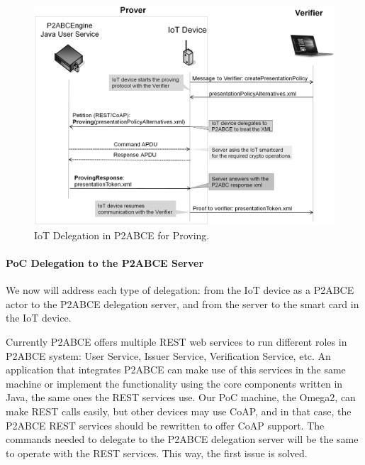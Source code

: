 \begin{figure}[bth]
	\begin{center}
		\includegraphics[width=\linewidth]{gfx/DelegationProving}
	\end{center}
	\caption{IoT Delegation in P2ABCE for Proving.}
	\label{fig:DelegationProving}
\end{figure}



\paragraph{PoC Delegation to the P2ABCE Server} \hfil

We now will address each type of delegation: from the IoT device as a P2ABCE actor to the P2ABCE delegation server, and from the server to the smart card in the IoT device.

\hfil

Currently P2ABCE offers multiple REST web services to run different roles in P2ABCE system: User Service, Issuer Service, Verification Service, etc. An application that integrates P2ABCE can make use of this services in the same machine or implement the functionality using the core components written in Java, the same ones the REST services use. Our PoC machine, the Omega2, can make REST calls easily, but other devices may use \ac{CoAP}, and in that case, the P2ABCE REST services should be rewritten to offer CoAP support. The commands needed to delegate to the P2ABCE delegation server will be the same to operate with the REST services. This way, the first issue is solved.

